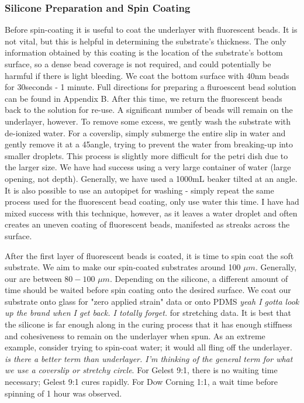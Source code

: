 \subsubsection{Silicone Preparation and Spin Coating}
Before spin-coating it is useful to coat the underlayer with fluorescent beads. It is not vital, but this is helpful in determining the substrate's thickness. The only information obtained by this coating is the location of the substrate's bottom surface, so a dense bead coverage is not required, and could potentially be harmful if there is light bleeding. We coat the bottom surface with 40nm beads for 30seconds - 1 minute. Full directions for preparing a fluroescent bead solution can be found in Appendix B. After this time, we return the fluorescent beads back to the solution for re-use. A significant number of beads will remain on the underlayer, however. To remove some excess, we gently wash the substrate with de-ionized water. For a coverslip, simply submerge the entire slip in water and gently remove it at a 45\degree angle, trying to prevent the water from breaking-up into smaller droplets. This process is slightly more difficult for the petri dish due to the larger size. We have had success using a very large container of water (large opening, not depth). Generally, we have used a 1000mL beaker tilted at an angle. It is also possible to use an autopipet for washing - simply repeat the same process used for the fluorescent bead coating, only use water this time. I have had mixed success with this technique, however, as it leaves a water droplet and often creates an uneven coating of fluorescent beads, manifested as streaks across the surface.

After the first layer of fluorescent beads is coated, it is time to spin coat the soft substrate. We aim to make our spin-coated substrates around 100 $\mu m$. Generally, our are between $80-100$ $\mu m$. Depending on the silicone, a different amount of time should be waited before spin coating onto the desired surface. We coat our substrate onto glass for "zero applied strain" data or onto PDMS \emph{yeah I gotta look up the brand when I get back. I totally forget.} for stretching data. It is best that the silicone is far enough along in the curing process that it has enough stiffness and cohesiveness to remain on the underlayer when spun. As an extreme example, consider trying to spin-coat water; it would all fling off the underlayer. \emph{is there a better term than underlayer. I'm thinking of the general term for what we use a coverslip or stretchy circle}. For Gelest 9:1, there is no waiting time necessary; Gelest 9:1 cures rapidly. For Dow Corning 1:1, a wait time before spinning of 1 hour was observed. 


